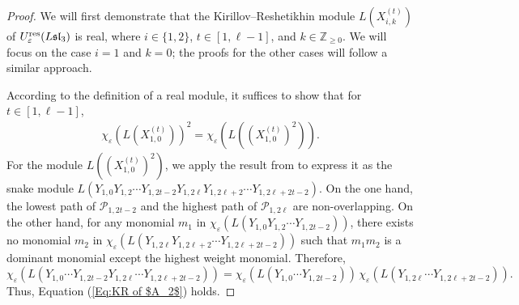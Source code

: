 \documentclass[11pt, reqno]{amsart}
\theoremstyle{plain}
\theoremstyle{definition}
\numberwithin{equation}{section}
\newcommand{\ZZ}{{\mathbb {Z}}}
\newcommand{\res}{{\rm res}}
\begin{document}
\begin{proof}
We will first demonstrate that the Kirillov--Reshetikhin module $L(X^{(t)}_{i,k})$ of $U_\varepsilon^\res({L\mathfrak{sl}_{3}})$ is real, where $i\in\{1,2\}$, $t\in[1,\ell-1]$, and $k\in \ZZ_{\geq 0}$. We will focus on the case $i=1$ and $k=0$; the proofs for the other cases will follow a similar approach.

According to the definition of a real module, it suffices to show that for $t\in[1,\ell-1]$,
\begin{align}\label{Eq:KR of $A_2$} 
\chi_\varepsilon(L(X^{(t)}_{1,0}))^2=\chi_\varepsilon(L((X^{(t)}_{1,0})^2)).
\end{align}
For the module $L((X^{(t)}_{1,0})^2)$, we apply the result from \cite[Theorem 1.1]{ALLZ25} to express it as the snake module $L(Y_{1,0}Y_{1,2}\cdots Y_{1,2t-2}Y_{1,2 \ell}Y_{1,2 \ell+2}\cdots Y_{1,2\ell+2t-2})$. On the one hand, the lowest path of $\mathscr{P}_{1,2t-2}$ and the highest path of $\mathscr{P}_{1,2\ell}$ are non-overlapping. On the other hand, for any monomial $m_1$ in $\chi_\varepsilon(L(Y_{1,0}Y_{1,2}\cdots Y_{1,2t-2}))$, there exists no monomial $m_2$ in $\chi_\varepsilon(L(Y_{1,2 \ell}Y_{1,2 \ell+2}\cdots Y_{1,2 \ell+2t-2}))$ such that $m_1m_2$ is a dominant monomial except the highest weight monomial. Therefore,  
\[
\chi_\varepsilon(L(Y_{1,0}\cdots Y_{1,2t-2}Y_{1,2 \ell}\cdots Y_{1,2\ell+2t-2}))= \chi_\varepsilon(L(Y_{1,0}\cdots Y_{1,2t-2}))\, \chi_\varepsilon(L(Y_{1,2 \ell}\cdots Y_{1,2\ell+2t-2})).
\]
Thus, Equation (\ref{Eq:KR of $A_2$}) holds.


\end{proof}
\end{document}
